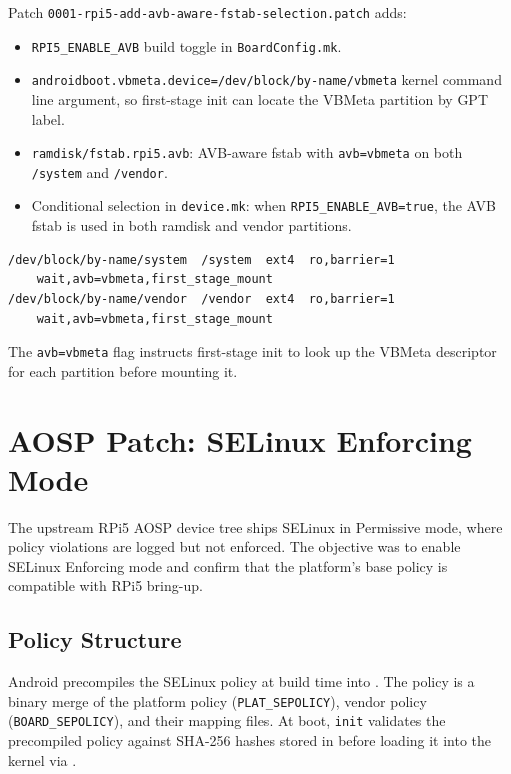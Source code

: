 Patch \texttt{0001-rpi5-add-avb-aware-fstab-selection.patch} adds:

\begin{itemize}
    \item \texttt{RPI5\_ENABLE\_AVB} build toggle in \texttt{BoardConfig.mk}.
    \item \texttt{androidboot.vbmeta.device=/dev/block/by-name/vbmeta} kernel command line argument, so first-stage init can locate the VBMeta partition by GPT label.
    \item \texttt{ramdisk/fstab.rpi5.avb}: AVB-aware fstab with \texttt{avb=vbmeta} on both \texttt{/system} and \texttt{/vendor}.
    \item Conditional selection in \texttt{device.mk}: when \texttt{RPI5\_ENABLE\_AVB=true}, the AVB fstab is used in both ramdisk and vendor partitions.
\end{itemize}

\begin{lstlisting}[caption={fstab.rpi5.avb --- system and vendor entries}]
/dev/block/by-name/system  /system  ext4  ro,barrier=1
    wait,avb=vbmeta,first_stage_mount
/dev/block/by-name/vendor  /vendor  ext4  ro,barrier=1
    wait,avb=vbmeta,first_stage_mount
\end{lstlisting}

The \texttt{avb=vbmeta} flag instructs first-stage init to look up the VBMeta descriptor for each partition before mounting it.

\section{AOSP Patch: SELinux Enforcing Mode}
\label{sec:impl_selinux}

The upstream RPi5 AOSP device tree ships SELinux in Permissive mode, where policy violations are logged but not enforced. The objective was to enable SELinux Enforcing mode and confirm that the platform's base policy is compatible with RPi5 bring-up.

\subsection{Policy Structure}

\begin{sloppypar}
Android precompiles the SELinux policy at build time into . The policy is a binary merge of the platform policy (\texttt{PLAT\_SEPOLICY}), vendor policy (\texttt{BOARD\_SEPOLICY}), and their mapping files. At boot, \texttt{init} validates the precompiled policy against SHA-256 hashes stored in  before loading it into the kernel via  \cite{selinux_build_precompiled}.
\end{sloppypar}

